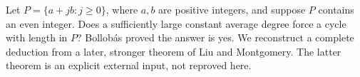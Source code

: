Let $P=\{a+jb:j\geq0\}$, where $a,b$ are positive integers, and
suppose $P$ contains an even integer. Does a sufficiently large
constant average degree force a cycle with length in $P$?
Bollob\'as proved the answer is yes. We reconstruct a complete
deduction from a later, stronger theorem of Liu and Montgomery.
The latter theorem is an explicit external input, not reproved here.
